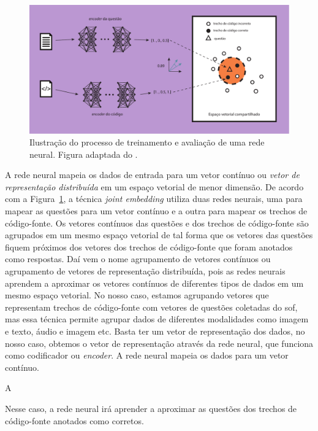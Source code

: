 \begin{figure}[H]
\centering
\includegraphics[width=1\textwidth]{figuras/cap-trabalhos-relacionados/joint_embedding.pdf}
\caption{Ilustração do processo de treinamento e avaliação de uma rede neural. Figura adaptada do \cite{nndesign:2014:pratical-training-issues}.} 
\label{fig:joint-embedding}
\end{figure}

A rede neural mapeia os dados de entrada para um vetor contínuo ou \emph{vetor de representação distribuída} em um espaço vetorial de menor dimensão. De acordo com a Figura~\ref{fig:joint-embedding}, a técnica \textit{joint embedding} utiliza duas redes neurais, uma para mapear as questões para um vetor contínuo e a outra para mapear os trechos de código-fonte. Os vetores contínuos das questões e dos trechos de código-fonte são agrupados em um mesmo espaço vetorial de tal forma que os vetores das questões fiquem próximos dos vetores dos trechos de código-fonte que foram anotados como respostas. Daí vem o nome agrupamento de vetores contínuos ou agrupamento de vetores de representação distribuída, pois as redes neurais aprendem a aproximar os vetores contínuos de diferentes tipos de dados em um mesmo espaço vetorial. No nosso caso, estamos agrupando vetores que representam trechos de código-fonte com vetores de questões coletadas do \Gls{sof}, mas essa técnica permite agrupar dados de diferentes modalidades como imagem e texto, áudio e imagem etc. Basta ter um vetor de representação dos dados, no nosso caso, obtemos o vetor de representação através da rede neural, que funciona como codificador ou \textit{encoder}. A rede neural mapeia os dados para um vetor contínuo.

A 

Nesse caso, a rede neural irá aprender a aproximar as questões dos trechos de código-fonte anotados como corretos. 

